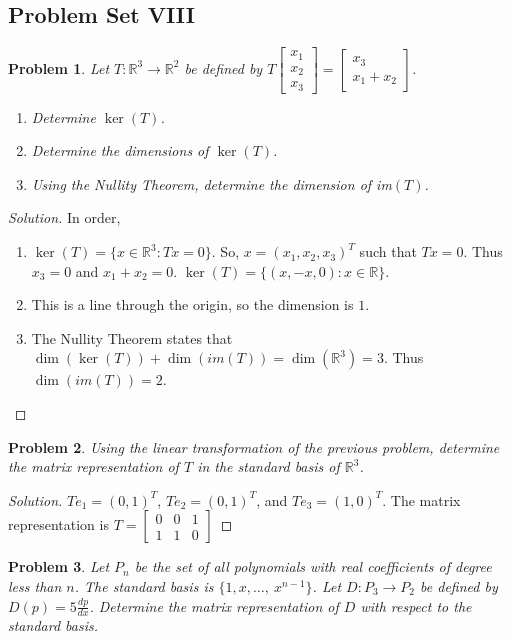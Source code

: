 \documentclass{article}
\theoremstyle{mystyle}
\newtheorem{problem}{Problem}[section]
\begin{document}
\subsection{Problem Set VIII}
\begin{problem}
Let $T:\mathbb{R}^3\rightarrow \mathbb{R}^2$ be defined by $T\begin{bmatrix} x_1 \\ x_2 \\ x_3 \end{bmatrix} = \begin{bmatrix} x_3 \\ x_1+x_2 \end{bmatrix}$.
\begin{enumerate}
    \item Determine $\ker(T)$.
    \item Determine the dimensions of $\ker(T)$.
    \item Using the Nullity Theorem, determine the dimension of im$(T)$.
\end{enumerate}
\end{problem}
\begin{proof}[Solution]
In order,
\begin{enumerate}
    \item $\ker(T)= \{x\in \mathbb{R}^3: Tx = 0\}$. So, $x = (x_1,x_2,x_3)^T$ such that $Tx = 0$. Thus $x_3 = 0$ and $x_1+x_2 = 0$. $\ker(T) = \{(x,-x,0):x\in \mathbb{R}\}$.
    \item This is a line through the origin, so the dimension is $1$. 
    \item The Nullity Theorem states that $\dim(\ker(T))+\dim(im(T)) = \dim(\mathbb{R}^3) = 3$. Thus $\dim(im(T)) = 2$.
\end{enumerate}
\end{proof}
\begin{problem}
Using the linear transformation of the previous problem, determine the matrix representation of $T$ in the standard basis of $\mathbb{R}^3$.
\end{problem}
\begin{proof}[Solution]
$Te_1 = (0,1)^T$, $T e_2 = (0,1)^T$, and $Te_3 = (1,0)^T$. The matrix representation is $T=\begin{bmatrix} 0 & 0 & 1 \\ 1 & 1 & 0 \end{bmatrix}$
\end{proof}
\begin{problem}
Let $P_n$ be the set of all polynomials with real coefficients of degree less than $n$. The standard basis is $\{1,x,\hdots, \ x^{n-1}\}$. Let $D:P_3 \rightarrow P_2$ be defined by $D(p) = 5\frac{dp}{dx}$. Determine the matrix representation of $D$ with respect to the standard basis.
\end{problem}
\end{document}
